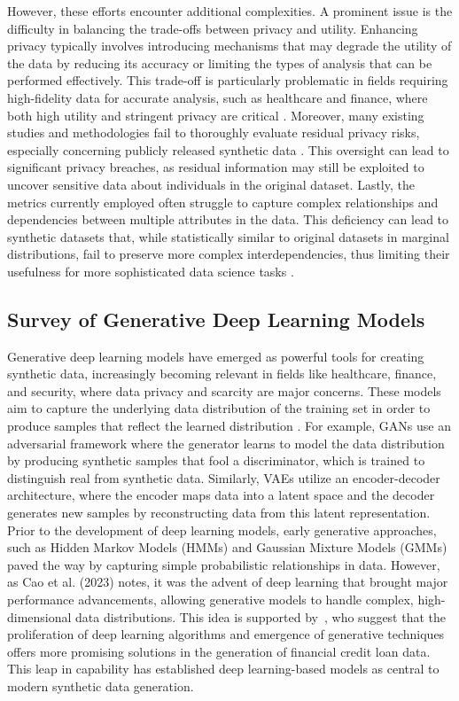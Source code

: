 \documentclass{article}
\begin{document}
However, these efforts encounter additional complexities. A prominent issue is the difficulty in balancing the trade-offs between privacy and utility. Enhancing privacy typically involves introducing mechanisms that may degrade the utility of the data by reducing its accuracy or limiting the types of analysis that can be performed effectively. This trade-off is particularly problematic in fields requiring high-fidelity data for accurate analysis, such as healthcare and finance, where both high utility and stringent privacy are critical \parencite{mendelevitch_fidelity_2021,caliskan_comparative_2023}. Moreover, many existing studies and methodologies fail to thoroughly evaluate residual privacy risks, especially concerning publicly released synthetic data \parencite{kaabachi_scoping_2024}. This oversight can lead to significant privacy breaches, as residual information may still be exploited to uncover sensitive data about individuals in the original dataset. Lastly, the metrics currently employed often struggle to capture complex relationships and dependencies between multiple attributes in the data. This deficiency can lead to synthetic datasets that, while statistically similar to original datasets in marginal distributions, fail to preserve more complex interdependencies, thus limiting their usefulness for more sophisticated data science tasks \parencite{jordon_synthetic_2022}.

\subsection{Survey of Generative Deep Learning Models}

Generative deep learning models have emerged as powerful tools for creating synthetic data, increasingly becoming relevant in fields like healthcare, finance, and security, where data privacy and scarcity are major concerns. These models aim to capture the underlying data distribution of the training set in order to produce samples that reflect the learned distribution \parencite{carvajal-patino_synthetic_2022}. For example, GANs use an adversarial framework where the generator learns to model the data distribution by producing synthetic samples that fool a discriminator, which is trained to distinguish real from synthetic data. Similarly, VAEs utilize an encoder-decoder architecture, where the encoder maps data into a latent space and the decoder generates new samples by reconstructing data from this latent representation. Prior to the development of deep learning models, early generative approaches, such as Hidden Markov Models (HMMs) and Gaussian Mixture Models (GMMs) paved the way by capturing simple probabilistic relationships in data. However, as Cao et al. (2023) notes, it was the advent of deep learning that brought major performance advancements, allowing generative models to handle complex, high-dimensional data distributions. This idea is supported by~\cite{caliskan_comparative_2023}, who suggest that the proliferation of deep learning algorithms and emergence of generative techniques offers more promising solutions in the generation of financial credit loan data. This leap in capability has established deep learning-based models as central to modern synthetic data generation. 
\end{document}
